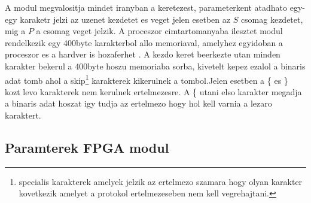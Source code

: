 \renewcommand{\img}{SajatRobot/FPGAmodulok/ProtokolDiagram.jpg}
\renewcommand{\sources}{*}
\renewcommand{\captionn}{FPGA komunikacios protokol altalanos csomag szerkezet}
\renewcommand{\figlabel}{FPGAComCsomagAlt}



A modul megvalositja mindet iranyban a keretezest, parameterkent atadhato egy-egy karaketr jelzi az uzenet kezdetet es veget jelen esetben az $S$ csomag kezdetet, mig a $P$ a csomag veget jelzik.
A proceszor cimtartomanyaba ilesztet modul rendelkezik egy 400byte karakterbol allo memoriaval, amelyhez egyidoban a proceszor es a hardver is hozaferhet \cite{DualPortRam}.
A kezdo keret beerkezte utan minden karakter bekerul a 400byte hoszu memoriaba sorba, kivetelt kepez ezalol a binaris adat tomb ahol a skip\footnote{specialis karakterek amelyek jelzik az ertelmezo szamara hogy olyan karakter kovetkezik amelyet a protokol ertelmezeseben nem kell vegrehajtani.} karakterek kikerulnek a tombol.Jelen esetben a \{ es \} kozt levo karakterek nem kerulnek ertelmezesre. A \{ utani elso karakter megadja a binaris adat hoszat igy tudja az ertelmezo hogy hol kell varnia a lezaro karaktert.

\subsection{Paramterek FPGA modul}

